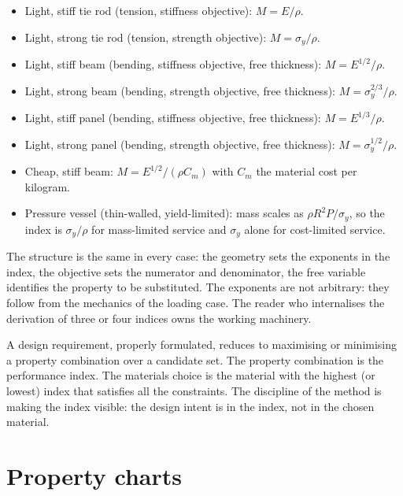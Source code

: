\begin{itemize}[leftmargin=*]
\item Light, stiff tie rod (tension, stiffness objective): $M =
  E / \rho$.
\item Light, strong tie rod (tension, strength objective): $M =
  \sigma_y / \rho$.
\item Light, stiff beam (bending, stiffness objective, free
  thickness): $M = E^{1/2} / \rho$.
\item Light, strong beam (bending, strength objective, free
  thickness): $M = \sigma_y^{2/3} / \rho$.
\item Light, stiff panel (bending, stiffness objective, free
  thickness): $M = E^{1/3} / \rho$.
\item Light, strong panel (bending, strength objective, free
  thickness): $M = \sigma_y^{1/2} / \rho$.
\item Cheap, stiff beam: $M = E^{1/2} / (\rho C_m)$ with $C_m$ the
  material cost per kilogram.
\item Pressure vessel (thin-walled, yield-limited): mass scales as
  $\rho R^2 P / \sigma_y$, so the index is $\sigma_y / \rho$ for
  mass-limited service and $\sigma_y$ alone for cost-limited service.
\end{itemize}

The structure is the same in every case: the geometry sets the
exponents in the index, the objective sets the numerator and
denominator, the free variable identifies the property to be
substituted. The exponents are not arbitrary: they follow from the
mechanics of the loading case. The reader who internalises the
derivation of three or four indices owns the working machinery.

\begin{principle}
A design requirement, properly formulated, reduces to maximising or
minimising a property combination over a candidate set. The property
combination is the performance index. The materials choice is the
material with the highest (or lowest) index that satisfies all the
constraints. The discipline of the method is making the index
visible: the design intent is in the index, not in the chosen
material.
\end{principle}

\section{Property charts}

